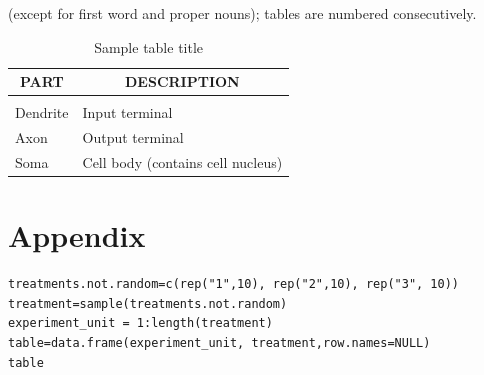 \documentclass{article} %
\begin{document}
(except for first word and proper nouns); tables are numbered consecutively.

\begin{table}[t]
\caption{Sample table title}
\label{sample-table}
\begin{center}
\begin{tabular}{ll}
\multicolumn{1}{c}{\bf PART}  &\multicolumn{1}{c}{\bf DESCRIPTION}
\\ \hline \\
Dendrite         &Input terminal \\
Axon             &Output terminal \\
Soma             &Cell body (contains cell nucleus) \\
\end{tabular}
\end{center}
\end{table}


 






\section{Appendix}

\appendix

\lstset{language=R}
\lstset{frame=lines}
\lstset{basicstyle=\footnotesize}
\begin{lstlisting}
treatments.not.random=c(rep("1",10), rep("2",10), rep("3", 10))
treatment=sample(treatments.not.random)
experiment_unit = 1:length(treatment)
table=data.frame(experiment_unit, treatment,row.names=NULL)
table
\end{lstlisting}
\end{document}
